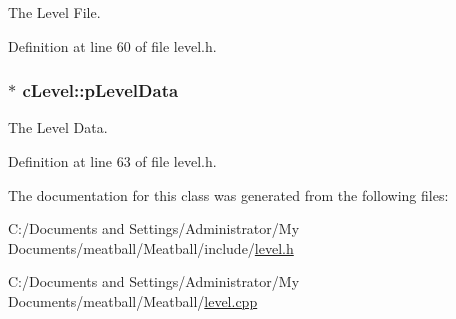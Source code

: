 The Level File. 



Definition at line 60 of file level.\-h.

\hypertarget{classc_level_ac1e503ae5528aa38c198671cf26ae6c3}{
\subsubsection[{p\-Level\-Data}]{$\ast$ c\-Level\-::p\-Level\-Data}}\label{classc_level_ac1e503ae5528aa38c198671cf26ae6c3}


The Level Data. 



Definition at line 63 of file level.\-h.



The documentation for this class was generated from the following files\-:\begin{DoxyCompactItemize}
\item 
C\-:/\-Documents and Settings/\-Administrator/\-My Documents/meatball/\-Meatball/include/\hyperlink{level_8h}{level.\-h}\item 
C\-:/\-Documents and Settings/\-Administrator/\-My Documents/meatball/\-Meatball/\hyperlink{level_8cpp}{level.\-cpp}\end{DoxyCompactItemize}
